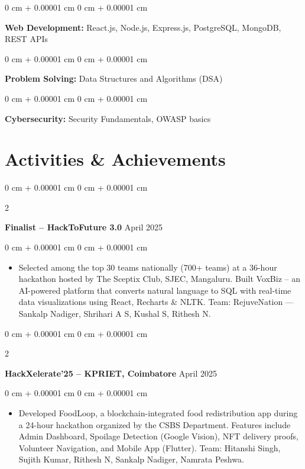 \documentclass[10pt, letterpaper]{article}
\newenvironment{highlights}{
    \begin{itemize}[
        topsep=0.10 cm,
        parsep=0.10 cm,
        partopsep=0pt,
        itemsep=0pt,
        leftmargin=0 cm + 10pt
    ]
}{
    \end{itemize}
} %
\newenvironment{onecolentry}{
    \begin{adjustwidth}{
        0 cm + 0.00001 cm
    }{
        0 cm + 0.00001 cm
    }
}{
    \end{adjustwidth}
} %
\newenvironment{twocolentry}[2][]{
    \onecolentry
    \def\secondColumn{#2}
    \setcolumnwidth{\fill, 4.5 cm}
    \begin{paracol}{2}
}{
    \switchcolumn \raggedleft \secondColumn
    \end{paracol}
    \endonecolentry
} %
\begin{document}
        \begin{onecolentry}
            \textbf{Web Development:} React.js, Node.js, Express.js, PostgreSQL, MongoDB, REST APIs
        \end{onecolentry}

        \vspace{0.2 cm}

        \begin{onecolentry}
            \textbf{Problem Solving:} Data Structures and Algorithms (DSA)
        \end{onecolentry}

        \vspace{0.2 cm}

        \begin{onecolentry}
            \textbf{Cybersecurity:} Security Fundamentals, OWASP basics
        \end{onecolentry}

    \section{Activities \& Achievements}

        \begin{twocolentry}{
            April 2025
        }
            \textbf{Finalist – HackToFuture 3.0}\end{twocolentry}
        \vspace{0.05 cm}
        \begin{onecolentry}
            \begin{highlights}
                \item Selected among the top 30 teams nationally (700+ teams) at a 36-hour hackathon hosted by The Sceptix Club, SJEC, Mangaluru. Built VoxBiz – an AI-powered platform that converts natural language to SQL with real-time data visualizations using React, Recharts \& NLTK. Team: RejuveNation — Sankalp Nadiger, Shrihari A S, Kushal S, Rithesh N.
            \end{highlights}
        \end{onecolentry}

        \vspace{0.2 cm}

        \begin{twocolentry}{
            April 2025
        }
            \textbf{HackXelerate'25 – KPRIET, Coimbatore}\end{twocolentry}
        \vspace{0.05 cm}
        \begin{onecolentry}
            \begin{highlights}
                \item Developed FoodLoop, a blockchain-integrated food redistribution app during a 24-hour hackathon organized by the CSBS Department. Features include Admin Dashboard, Spoilage Detection (Google Vision), NFT delivery proofs, Volunteer Navigation, and Mobile App (Flutter). Team: Hitanshi Singh, Sujith Kumar, Rithesh N, Sankalp Nadiger, Namrata Peshwa.
            \end{highlights}
        \end{onecolentry}
\end{document}
